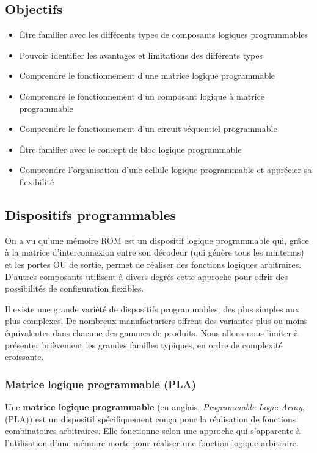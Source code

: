 \documentclass[11pt]{article}
\begin{document}
\subsection{Objectifs}
\label{sec:org0a4f155}
\begin{itemize}
\item Être familier avec les différents types de composants logiques programmables
\item Pouvoir identifier les avantages et limitations des différents types
\item Comprendre le fonctionnement d'une matrice logique programmable
\item Comprendre le fonctionnement d'un composant logique à matrice programmable
\item Comprendre le fonctionnement d'un circuit séquentiel programmable
\item Être familier avec le concept de bloc logique programmable
\item Comprendre l'organisation d'une cellule logique programmable et
apprécier sa flexibilité
\end{itemize}

\subsection{Dispositifs programmables}
\label{sec:org35d7365}

On a vu qu'une mémoire ROM est un dispositif logique programmable qui,
grâce à la matrice d'interconnexion entre son décodeur (qui génère
tous les minterms) et les portes OU de sortie, permet de réaliser des
fonctions logiques arbitraires. D'autres composants utilisent à divers
degrés cette approche pour offrir des possibilités de configuration
flexibles.

Il existe une grande variété de dispositifs programmables, des plus
simples aux plus complexes. De nombreux manufacturiers offrent des
variantes plus ou moins équivalentes dans chacune des gammes de
produits. Nous allons nous limiter à présenter brièvement les grandes
familles typiques, en ordre de complexité croissante.

\subsubsection{Matrice logique programmable (PLA)}
\label{sec:org42f74c5}

Une \textbf{matrice logique programmable} (en anglais, \emph{Programmable Logic
Array}, (PLA)) est un dispositif spécifiquement conçu pour la
réalisation de fonctions combinatoires arbitraires. Elle fonctionne
selon une approche qui s'apparente à l'utilisation d'une mémoire morte
pour réaliser une fonction logique arbitraire.
\end{document}
